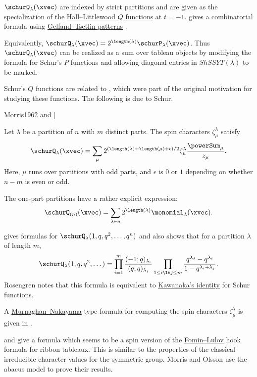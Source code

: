 \label{schurQFunction}
$\schurQ_\lambda(\xvec)$ are indexed by strict partitions
and are given
as the specialization of the
\hyperref[hallLittlewoodQ]{Hall--Littlewood $Q$ functions} at $t=-1$.
 gives a combinatorial formula using
\hyperref[gtpatterns]{Gelfand--Tsetlin patterns} \cite{Stanley1986}.

Equivalently,
$\schurQ_\lambda(\xvec) = 2^{\length(\lambda)} \schurP_\lambda(\xvec)$.
Thus $\schurQ_\lambda(\xvec)$ can be realized as a sum over tableau objects
by modifying the formula for Schur's $P$ functions and allowing diagonal
entries in $ShSSYT(\lambda)$ to be marked.


Schur's $Q$ functions are related to
\label{spinCharacter},
which were part of the original motivation for studying these functions.
The following is due to Schur.

\begin{theorem}[See \cite[3.3.6]{Morris1962} and \cite[(7.1)]{Stembridge1989}]

Let $\lambda$ be a partition of $n$ with $m$ distinct parts.
The spin characters $\zeta_{\mu}^{\lambda}$ satisfy
\[
\schurQ_\lambda(\xvec) = \sum_{\mu}
2^{(\length(\lambda)+ \length(\mu)+\epsilon)/2}
\zeta_{\mu}^{\lambda} \frac{ \powerSum_{\mu} }{z_\mu} .
\]
Here, $\mu$ runs over partitions with odd parts,
and $\epsilon$ is $0$ or $1$ depending on whether $n-m$ is even or odd.
\end{theorem}

The one-part partitions have a rather explicit expression:
\[
\schurQ_{(n)}(\xvec) = \sum_{\lambda \vdash n} 2^{\length(\lambda)} \monomial_{\lambda}(\xvec).
\]


 gives formulas for
$\schurQ_{\lambda}(1,q,q^2,\dotsc,q^n)$ and also shows
\cite[Prop.~3.1]{Rosengren2008} that for a partition $\lambda$ of length $m$,
\[
\schurQ_{\lambda}(1,q,q^2,\dotsc) = \prod_{i=1}^m \frac{(-1;q)_{\lambda_i}}{ (q;q)_{\lambda_i} }
\prod_{1 \leq i \lt j \leq m} \frac{q^{\lambda_j} - q^{\lambda_i}}{1-q^{\lambda_i+\lambda_j}}.
\]
Rosengren notes that this formula is equivalent to
\hyperref[schurKawanaka]{Kawanaka's identity} for Schur functions.


A \hyperref[murnaghanNakayamaRule]{Murnaghan--Nakayama}-type formula for computing
the spin characters $\zeta_{\mu}^{\lambda}$ is given in \cite{MorrisOlsson1988}.

 and  give \cite[Cor.~4.3]{MorrisOlsson1988}
a formula which seems to be a spin
version of the \hyperref[borderStripHookFormulas]{Fomin--Lulov}
hook formula for ribbon tableaux.
This is similar to the properties of the classical irreducible
character values for the symmetric group.
Morris and Olsson use the abacus model to prove their results.


